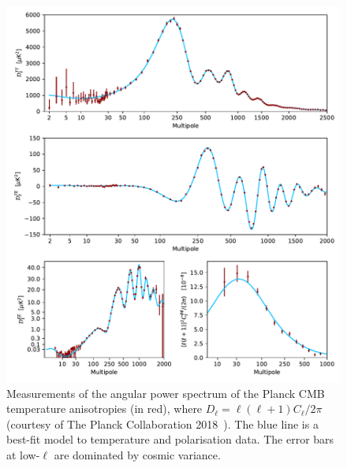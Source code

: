\begin{figure}[htpb]
	\centering\capstart{}
	\includegraphics[trim={0 430 0 0},clip,width=\textwidth]{planck_2018_power_spectrum.pdf}
	\caption[
	The 2018 Planck CMB angular power spectrum in temperature
	]{
	Measurements of the angular power spectrum of the Planck CMB temperature anisotropies (in red), where \(D_{\ell} = \ell(\ell+1)C_{\ell}/2\pi{}\) (courtesy of The Planck Collaboration 2018~\cite{Planck2020}).
	The blue line is a best-fit model to temperature and polarisation data.
	The error bars at low-\(\ell{}\) are dominated by cosmic variance.
	}\label{fig:chapter2_power_spectrum}
\end{figure}
